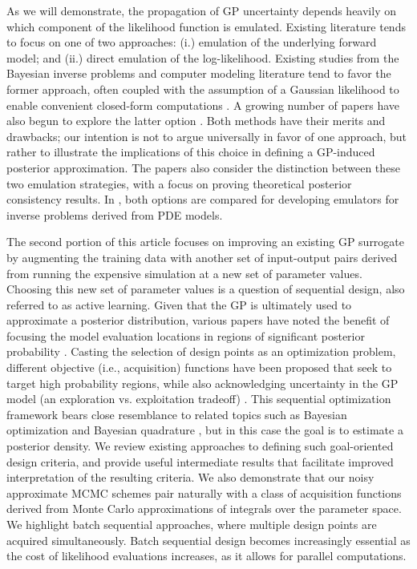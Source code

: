 \documentclass[12pt]{article}
\begin{document}
As we will demonstrate, the propagation of GP uncertainty depends heavily on which component of the likelihood function 
is emulated. Existing literature tends to focus on one of two approaches: (i.) emulation of the underlying forward model; and 
(ii.) direct emulation of the log-likelihood. Existing studies from the Bayesian inverse problems and computer modeling 
literature tend to favor the former approach, often coupled with the assumption of a Gaussian likelihood to enable
convenient closed-form computations \citep{HigdonBasis,functionValuedModels,hydrologicalModel,VillaniAdaptiveGP}. 
A growing number of papers have also begun to explore the latter option 
\citep{VehtariParallelGP,gp_surrogates_random_exploration,FerEmulation,ActiveLearningMCMC,quantileApprox,llikRBF,trainDynamics,MCMC_GP_proposal,landslideCalibration,Kandasamy_2017,wang2018adaptive}. 
Both methods have their merits and drawbacks; our intention is not to argue universally in favor of one approach, but rather
to illustrate the implications of this choice in defining a GP-induced posterior approximation. The papers 
\citet{StuartTeck1,StuartTeck2,random_fwd_models} also consider the distinction between these two emulation strategies, 
with a focus on proving theoretical posterior consistency results. In \citet{GP_PDE_priors}, both options are compared 
for developing emulators for inverse problems derived from PDE models.

The second portion of this article focuses on improving an existing GP surrogate by augmenting the training data 
with another set of input-output pairs derived from running the expensive simulation at a new set of parameter 
values. Choosing this new set of parameter values is a question of sequential design, also referred to as active learning.
Given that the GP is ultimately used to approximate a posterior distribution, various papers have noted the benefit of 
focusing the model evaluation locations in regions of significant posterior probability 
\citep{CES,idealizedGCM}. Casting the selection of 
design points as an optimization problem, different objective (i.e., acquisition) functions have been proposed that seek 
to target high probability regions, while also acknowledging uncertainty in the GP model 
(an exploration vs. exploitation tradeoff) \citep{SinsbeckNowak,Surer2023sequential,KandasamyActiveLearning2015,weightedIVAR,VehtariParallelGP,VillaniAdaptiveGP}. 
This sequential optimization framework bears close resemblance to related 
topics such as Bayesian optimization \citep{reviewBayesOpt} and Bayesian quadrature 
\citep{BayesQuadrature,BayesQuadratureAL,BayesQuadRatios},
 but in this case the goal is to estimate a posterior density.
We review existing approaches to defining such goal-oriented design criteria, and provide useful intermediate results that 
facilitate improved interpretation of the resulting criteria. We also demonstrate that our noisy approximate MCMC 
schemes pair naturally with a class of acquisition functions derived from Monte Carlo approximations of integrals over the 
parameter space. We highlight batch sequential approaches, where multiple design points are acquired simultaneously. 
Batch sequential design becomes increasingly essential as the cost of likelihood evaluations increases, as it allows for 
parallel computations.
\end{document}
